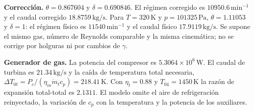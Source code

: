 \textbf{Corrección.} $\theta=0.867604$ y $\delta=0.690846$. El régimen corregido es $10950.6\,\mathrm{min^{-1}}$ y el caudal corregido $18.8759\,\mathrm{kg/s}$. Para $T=320\,\mathrm K$ y $p=101325\,\mathrm{Pa}$, $\theta=1.11053$ y $\delta=1$: el régimen físico es $11540\,\mathrm{min^{-1}}$ y el caudal físico $17.9119\,\mathrm{kg/s}$. Se supone el mismo gas, número de Reynolds comparable y la misma cinemática; no se corrige por holguras ni por cambios de $\gamma$.

\textbf{Generador de gas.} La potencia del compresor es $5.3064\times10^{6}\,\mathrm W$. El caudal de turbina es $21.34\,\mathrm{kg/s}$ y la caída de temperatura total necesaria, $\Delta T_{0t}=P_c/(\eta_m\dot m_tc_{p})=218.41\,\mathrm K$. Con $\eta_t=0.88$ y $T_{04}=1450\,\mathrm K$ la razón de expansión total-total es $2.1311$. El modelo omite el aire de refrigeración reinyectado, la variación de $c_p$ con la temperatura y la potencia de los auxiliares.


